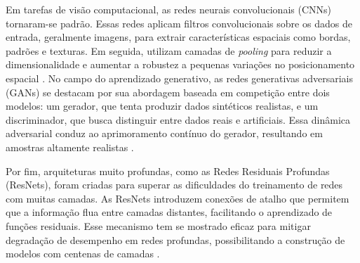 Em tarefas de visão computacional, as redes neurais convolucionais (CNNs) tornaram-se padrão. Essas redes aplicam filtros convolucionais sobre os dados de entrada, geralmente imagens, para extrair características espaciais como bordas, padrões e texturas. Em seguida, utilizam camadas de \textit{pooling} para reduzir a dimensionalidade e aumentar a robustez a pequenas variações no posicionamento espacial . No campo do aprendizado generativo, as redes generativas adversariais (GANs) se destacam por sua abordagem baseada em competição entre dois modelos: um gerador, que tenta produzir dados sintéticos realistas, e um discriminador, que busca distinguir entre dados reais e artificiais. Essa dinâmica adversarial conduz ao aprimoramento contínuo do gerador, resultando em amostras altamente realistas .

Por fim, arquiteturas muito profundas, como as Redes Residuais Profundas (ResNets), foram criadas para superar as dificuldades do treinamento de redes com muitas camadas. As ResNets introduzem conexões de atalho que permitem que a informação flua entre camadas distantes, facilitando o aprendizado de funções residuais. Esse mecanismo tem se mostrado eficaz para mitigar degradação de desempenho em redes profundas, possibilitando a construção de modelos com centenas de camadas .

